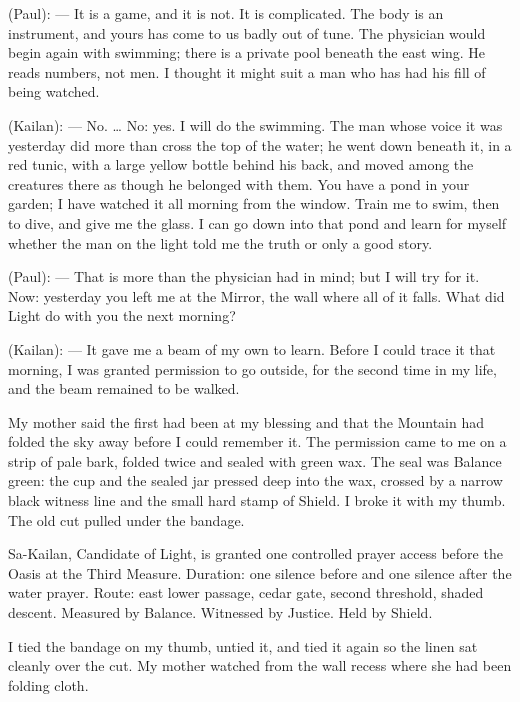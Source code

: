 \begin{room}
(Paul): --- It is a game, and it is not. It is complicated. The body is an instrument, and yours has come to us badly out of tune. The physician would begin again with swimming; there is a private pool beneath the east wing. He reads numbers, not men. I thought it might suit a man who has had his fill of being watched.

(Kailan): --- No. \ldots{} No: yes. I will do the swimming. The man whose voice it was yesterday did more than cross the top of the water; he went down beneath it, in a red tunic, with a large yellow bottle behind his back, and moved among the creatures there as though he belonged with them. You have a pond in your garden; I have watched it all morning from the window. Train me to swim, then to dive, and give me the glass. I can go down into that pond and learn for myself whether the man on the light told me the truth or only a good story.

(Paul): --- That is more than the physician had in mind; but I will try for it. Now: yesterday you left me at the Mirror, the wall where all of it falls. What did Light do with you the next morning?

(Kailan): --- It gave me a beam of my own to learn. Before I could trace it that morning, I was granted permission to go outside, for the second time in my life, and the beam remained to be walked.

\end{room}

My mother said the first had been at my blessing and that the Mountain had folded the sky away before I could remember it. The permission came to me on a strip of pale bark, folded twice and sealed with green wax. The seal was Balance green: the cup and the sealed jar pressed deep into the wax, crossed by a narrow black witness line and the small hard stamp of Shield. I broke it with my thumb. The old cut pulled under the bandage.\par

\begin{scripture}
Sa-Kailan, Candidate of Light, is granted one controlled prayer access before the Oasis at the Third Measure. Duration: one silence before and one silence after the water prayer. Route: east lower passage, cedar gate, second threshold, shaded descent. Measured by Balance. Witnessed by Justice. Held by Shield.\par
\end{scripture}

I tied the bandage on my thumb, untied it, and tied it again so the linen sat cleanly over the cut. My mother watched from the wall recess where she had been folding cloth.\par

